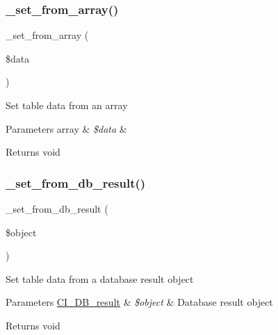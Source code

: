\subsubsection{\texorpdfstring{\+\_\+set\+\_\+from\+\_\+array()}{\_set\_from\_array()}}
{\footnotesize\ttfamily \+\_\+set\+\_\+from\+\_\+array (\begin{DoxyParamCaption}\item[{}]{\$data }\end{DoxyParamCaption})\hspace{0.3cm}{\ttfamily [protected]}}

Set table data from an array


\begin{DoxyParams}[1]{Parameters}
array & {\em \$data} & \\
\hline
\end{DoxyParams}
\begin{DoxyReturn}{Returns}
void 
\end{DoxyReturn}
\mbox{\label{class_c_i___table_a76d76f4f5ffe03c119b95164dcebf9ed}} 
\subsubsection{\texorpdfstring{\+\_\+set\+\_\+from\+\_\+db\+\_\+result()}{\_set\_from\_db\_result()}}
{\footnotesize\ttfamily \+\_\+set\+\_\+from\+\_\+db\+\_\+result (\begin{DoxyParamCaption}\item[{}]{\$object }\end{DoxyParamCaption})\hspace{0.3cm}{\ttfamily [protected]}}

Set table data from a database result object


\begin{DoxyParams}[1]{Parameters}
\mbox{\hyperlink{class_c_i___d_b__result}{C\+I\+\_\+\+D\+B\+\_\+result}} & {\em \$object} & Database result object \\
\hline
\end{DoxyParams}
\begin{DoxyReturn}{Returns}
void 
\end{DoxyReturn}
\mbox{\label{class_c_i___table_aed032b02068e33116d9ecf9a0eedbbbe}} 

